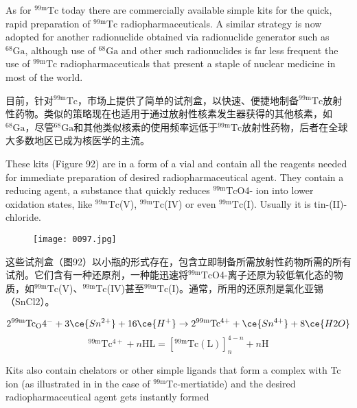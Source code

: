 \documentclass[dvipsnames, svgnames,a4paper,11pt]{article}
\begin{document}
As for ${}^\mathrm{99m}\mathrm{Tc}$ today there are commercially available simple kits for the quick, rapid
preparation of ${}^\mathrm{99m}\mathrm{Tc}$ radiopharmaceuticals. A similar strategy is now adopted for
another radionuclide obtained via radionuclide generator such as ${}^{68}\mathrm{Ga}$, although use
of ${}^{68}\mathrm{Ga}$ and other such radionuclides is far less frequent the use of ${}^\mathrm{99m}\mathrm{Tc}$
radiopharmaceuticals that present a staple of nuclear medicine in most of the world.

目前，针对${}^\mathrm{99m}\mathrm{Tc}$，市场上提供了简单的试剂盒，以快速、便捷地制备${}^\mathrm{99m}\mathrm{Tc}$放射性药物。类似的策略现在也适用于通过放射性核素发生器获得的其他核素，如${}^{68}\mathrm{Ga}$，尽管${}^{68}\mathrm{Ga}$和其他类似核素的使用频率远低于${}^\mathrm{99m}\mathrm{Tc}$放射性药物，后者在全球大多数地区已成为核医学的主流。



These kits (Figure 92) are in a form of a vial and contain all the reagents needed for
immediate preparation of desired radiopharmaceutical agent. They contain a
reducing agent, a substance that quickly reduces ${}^\mathrm{99m}\mathrm{Tc}$O4- ion into lower oxidation
states, like ${}^\mathrm{99m}\mathrm{Tc}$(V), ${}^\mathrm{99m}\mathrm{Tc}$(IV) or even ${}^\mathrm{99m}\mathrm{Tc}$(I). Usually it is tin-(II)-chloride.

\begin{figure}[h]
    \centering
    \texttt{[image: 0097.jpg]}
     \label{fig92}
\end{figure}

这些试剂盒（图92）以小瓶的形式存在，包含立即制备所需放射性药物所需的所有试剂。它们含有一种还原剂，一种能迅速将${}^\mathrm{99m}\mathrm{Tc}$O4-离子还原为较低氧化态的物质，如${}^\mathrm{99m}\mathrm{Tc}$(V)、${}^\mathrm{99m}\mathrm{Tc}$(IV)甚至${}^\mathrm{99m}\mathrm{Tc}$(I)。通常，所用的还原剂是氯化亚锡（SnCl2）。

\[
\mathrm{2^{99m}Tc_O4^-} + 3\ce{Sn^{2+}} + 16\ce{H^+} \rightarrow \mathrm{2^{99m}Tc^{4+}} + \ce{Sn^{4+}} + 8\ce{H2O}
\]
\[
\mathrm{^{99m}Tc^{4+}} + n\mathrm{HL} = [\mathrm{^{99m}Tc(L)}]_n^{4-n} + n\mathrm{H}
\]

Kits also contain chelators or other simple ligands that form a complex with Tc ion
(as illustrated in in the case of ${}^\mathrm{99m}\mathrm{Tc}$-mertiatide) and the desired radiopharmaceutical
agent gets instantly formed
\end{document}
